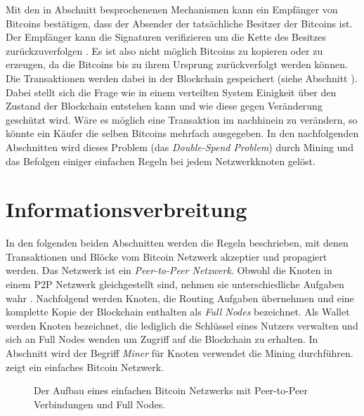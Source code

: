 \documentclass[ngerman,runningheads,a4paper]{llncs}[2018/03/10]
\begin{document}
Mit den in Abschnitt  besprochenenen Mechanismen kann ein Empfänger von Bitcoins bestätigen, dass der Absender der tatsächliche Besitzer der Bitcoins ist. Der Empfänger kann die Signaturen verifizieren um die Kette des Besitzes zurückzuverfolgen \citep{bitcoinPDF}. Es ist also nicht möglich Bitcoins zu kopieren oder zu erzeugen, da die Bitcoins bis zu ihrem Ursprung zurückverfolgt werden können. Die Transaktionen werden dabei in der Blockchain gespeichert (siehe Abschnitt ). Dabei stellt sich die Frage wie in einem verteilten System Einigkeit über den Zustand der Blockchain entstehen kann und wie diese gegen Veränderung geschützt wird. Wäre es möglich eine Transaktion im nachhinein zu verändern, so könnte ein Käufer die selben Bitcoins mehrfach ausgegeben. In den nachfolgenden Abschnitten wird dieses Problem (das \textit{Double-Spend Problem}) durch Mining und das Befolgen einiger einfachen Regeln bei jedem Netzwerkknoten gelöst.


\section{Informationsverbreitung}\label{sec:informationsverbreitung}

In den folgenden beiden Abschnitten werden die Regeln beschrieben, mit denen Transaktionen und Blöcke vom Bitcoin Netzwerk akzeptier und propagiert werden. Das Netzwerk ist ein \textit{Peer-to-Peer Netzwerk}. Obwohl die Knoten in einem P2P Netzwerk gleichgestellt sind, nehmen sie unterschiedliche Aufgaben wahr \citep{bitcoinbook}. Nachfolgend werden Knoten, die Routing Aufgaben übernehmen und eine komplette Kopie der Blockchain enthalten als \textit{Full Nodes} bezeichnet. Als Wallet werden Knoten bezeichnet, die lediglich die Schlüssel eines Nutzers verwalten und sich an Full Nodes wenden um Zugriff auf die Blockchain zu erhalten. In Abschnitt  wird der Begriff \textit{Miner} für Knoten verwendet die Mining durchführen.  zeigt ein einfaches Bitcoin Netzwerk. 


\begin{figure}
  \centering
  \caption{Der Aufbau eines einfachen Bitcoin Netzwerks mit Peer-to-Peer Verbindungen und Full Nodes.}
  \label{fig:basicNetwork}
\end{figure}
\end{document}
